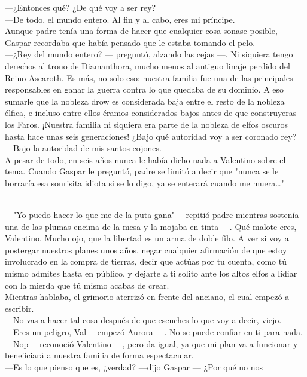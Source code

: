 \documentclass[
  letterpaper,
]{book}
\begin{document}
---¿Entonces qué? ¿De qué voy a ser rey?\\
---De todo, el mundo entero. Al fin y al cabo, eres mi príncipe.\\
Aunque padre tenía una forma de hacer que cualquier cosa sonase posible,
Gaspar recordaba que había pensado que le estaba tomando el pelo.\\
---¿Rey del mundo entero? --- preguntó, alzando las cejas ---. Ni
siquiera tengo derechos al trono de Diamanthora, mucho menos al antiguo
linaje perdido del Reino Ascaroth. Es más, no solo eso: nuestra familia
fue una de las principales responsables en ganar la guerra contra lo que
quedaba de su dominio. A eso sumarle que la nobleza drow es considerada
baja entre el resto de la nobleza élfica, e incluso entre ellos éramos
considerados bajos antes de que construyeras los Faros. ¡Nuestra familia
ni siquiera era parte de la nobleza de elfos oscuros hasta hace unas
seis generaciones! ¿Bajo qué autoridad voy a ser coronado rey?\\
---Bajo la autoridad de mis santos cojones.\\
A pesar de todo, en seis años nunca le había dicho nada a Valentino
sobre el tema. Cuando Gaspar le preguntó, padre se limitó a decir que
"nunca se le borraría esa sonrisita idiota si se lo digo, ya se enterará
cuando me muera\ldots"\\
\strut \\
---"Yo puedo hacer lo que me de la puta gana" ---repitió padre mientras
sostenía una de las plumas encima de la mesa y la mojaba en tinta ---.
Qué malote eres, Valentino. Mucho ojo, que la libertad es un arma de
doble filo. A ver si voy a postergar nuestros planes unos años, negar
cualquier afirmación de que estoy involucrado en la compra de tierras,
decir que actúas por tu cuenta, como tú mismo admites hasta en público,
y dejarte a ti solito ante los altos elfos a lidiar con la mierda que tú
mismo acabas de crear.\\
Mientras hablaba, el grimorio aterrizó en frente del anciano, el cual
empezó a escribir.\\
---No vas a hacer tal cosa después de que escuches lo que voy a decir,
viejo.\\
---Eres un peligro, Val ---empezó Aurora ---. No se puede confiar en ti
para nada.\\
---Nop ---reconoció Valentino ---, pero da igual, ya que mi plan va a
funcionar y beneficiará a nuestra familia de forma espectacular.\\
---Es lo que pienso que es, ¿verdad? ---dijo Gaspar --- ¿Por qué no nos
\end{document}
